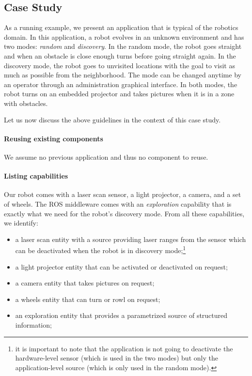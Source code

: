 \subsection{Case Study}

As a running example, we present an application that is typical of the
robotics domain. In this application, a robot evolves in an unknown
environment and has two modes: \emph{random} and \emph{discovery}. In
the random mode, the robot goes straight and when an obstacle is close
enough turns before going straight again. In the discovery mode, the
robot goes to unvisited locations with the goal to visit as much as
possible from the neighborhood. The mode can be changed anytime by an
operator through an administration graphical interface. In both modes,
the robot turns on an embedded projector and takes pictures when it is
in a zone with obstacles.

Let us now discuss the above guidelines in the context of this case
study.

\paragraph{Reusing existing components}
We assume no previous \diaspec{} application and thus no \diaspec{}
component to reuse.

\paragraph{Listing capabilities}
Our robot comes with a laser scan sensor, a light projector, a camera,
and a set of wheels. The ROS middleware comes with an
\emph{exploration} capability that is exactly what we need for the
robot's discovery mode. From all these capabilities, we identify:
\begin{itemize}
\item a laser scan entity with a  source providing laser
  ranges from the sensor which can be deactivated when the robot is in
  discovery mode;\footnote{it is important to note that the
    application is not going to deactivate the hardware-level sensor
    (which is used in the two modes) but only the application-level
    source (which is only used in the random mode).}
\item a light projector entity that can be activated or deactivated on request;
\item a camera entity that takes pictures on request;
\item a wheels entity that can turn or rowl on request;
\item an exploration entity that provides a parametrized source of
  structured information;
\end{itemize}

